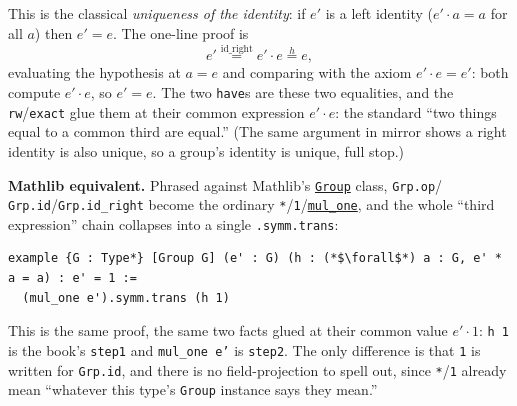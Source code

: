 \begin{mathreading}

This is the classical \emph{uniqueness of the identity}: if \(e'\) is a left identity (\(e'\cdot a = a\) for all \(a\)) then \(e' = e\). The one-line proof is \[
e' \overset{\text{id\_right}}{=} e' \cdot e \overset{h}{=} e,
\] evaluating the hypothesis at \(a = e\) and comparing with the axiom \(e'\cdot e
= e'\): both compute \(e' \cdot e\), so \(e' = e\). The two \texttt{have}s are these two equalities, and the \texttt{rw}/\texttt{exact} glue them at their common expression \(e'\cdot
e\): the standard ``two things equal to a common third are equal.'' (The same argument in mirror shows a right identity is also unique, so a group's identity is unique, full stop.)

\end{mathreading}

\textbf{Mathlib equivalent.} Phrased against Mathlib's \href{https://loogle.lean-lang.org/?q=Group}{\texttt{Group}} class, \texttt{Grp.op}/ \texttt{Grp.id}/\texttt{Grp.id\_\allowbreak{}right} become the ordinary \texttt{*}/\texttt{1}/\href{https://loogle.lean-lang.org/?q=mul_one}{\texttt{mul\_\allowbreak{}one}}, and the whole ``third expression'' chain collapses into a single \texttt{.symm.trans}:

\begin{lstlisting}
example {G : Type*} [Group G] (e' : G) (h : (*$\forall$*) a : G, e' * a = a) : e' = 1 :=
  (mul_one e').symm.trans (h 1)
\end{lstlisting}

This is the same proof, the same two facts glued at their common value \(e'\cdot 1\): \texttt{h 1} is the book's \texttt{step1} and \texttt{mul\_\allowbreak{}one e'} is \texttt{step2}. The only difference is that \texttt{1} is written for \texttt{Grp.id}, and there is no field-projection to spell out, since \texttt{*}/\texttt{1} already mean ``whatever this type's \texttt{Group} instance says they mean.''
